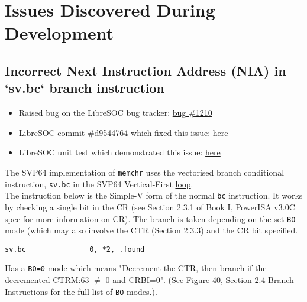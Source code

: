 \section{Issues Discovered During Development}

\subsection{Incorrect Next Instruction Address (NIA) in `sv.bc` branch instruction}

\begin{itemize}
  \item Raised bug on the LibreSOC bug tracker:
  \href{https://bugs.libre-soc.org/show_bug.cgi?id=1210}{bug \#1210}
  \item LibreSOC commit \#d9544764 which fixed this issue:
  \href{https://git.libre-soc.org/?p=openpower-isa.git;a=commitdiff;h=d9544764b1710f3807a9c0685d150a665f70b9a2}{here}
  \item LibreSOC unit test which demonstrated this issue:
  \href{https://git.libre-soc.org/?p=openpower-isa.git;a=blob;f=src/openpower/decoder/isa/test_caller_svp64_bc.py;h=93689ded619f8fa67b455f18b122fa60220ddea1;hb=089e6d352ec57be4ab645d18ad9e95df3af0d365#l310}{here}
\end{itemize}

The SVP64 implementation of \texttt{memchr} uses the vectorised branch
conditional instruction, \texttt{sv.bc} in the SVP64 Vertical-First
\href{https://git.vantosh.com/ngisearch/glibc-svp64/src/commit/1afb94889b8ea2f85844e410f87e5a9b8e2e959f/svp64-port/svp64/memchr_svp64.s#L67}{loop}.\\

The instruction below is the Simple-V form of the normal \texttt{bc} instruction.
It works by checking a single bit in the \acrfull{CR}
(see Section 2.3.1 of Book I, PowerISA v3.0C spec for more information
on \acrshort{CR}).
The branch is taken depending on the set \texttt{BO} mode (which may also
involve the \acrfull{CTR} (Section 2.3.3) and the CR bit specified.

\begin{verbatim}
sv.bc               0, *2, .found
\end{verbatim}

Has a \texttt{BO=0} mode which means "Decrement the CTR, then branch
if the decremented CTRM:63 $\neq$ 0 and CRBI=0". (See Figure 40, Section 2.4
Branch Instructions for the full list of \texttt{BO} modes.).\\

